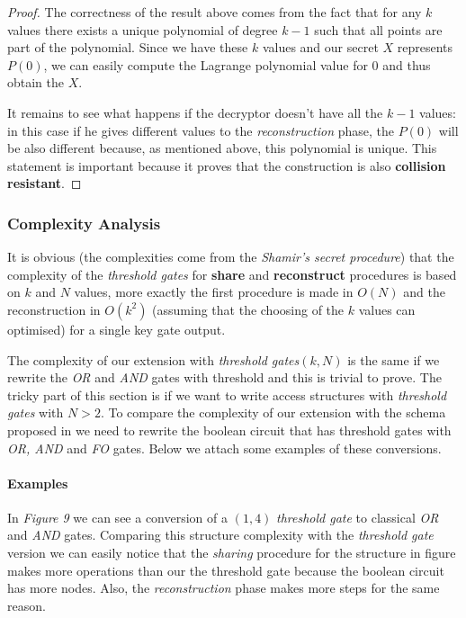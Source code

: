 \documentclass[12pt]{article}
\begin{document}
\begin{proof}
The correctness of the result above comes from the fact that for any $k$ values there exists a unique polynomial of degree $k - 1$ such that all points are part of the polynomial. Since we have these $k$ values and our secret $X$ represents $P(0)$, we can easily compute the Lagrange polynomial value for $0$ and thus obtain the  $X$.

It remains to see what happens if the decryptor doesn't have all the $k - 1$ values: in this case if he gives different values to the \textit{reconstruction} phase, the $P(0)$ will be also different because, as mentioned above, this polynomial is unique. This statement is important because it proves that the construction is also \textbf{collision resistant}.

\end{proof}

\subsubsection{Complexity Analysis}

It is obvious (the complexities come from the \textit{Shamir's secret procedure}) that the complexity of the \textit{threshold gates} for \textbf{share} and \textbf{reconstruct} procedures is based on $k$ and $N$ values, more exactly the first procedure is made in $O(N)$ and the reconstruction in $O(k^ 2)$ (assuming that the choosing of the $k$ values can optimised) for a single key gate output.

The complexity of our extension with \textit{threshold gates}$(k, N)$ is the same if we rewrite the \textit{OR} and \textit{AND} gates with threshold and this is trivial to prove. The tricky part of this section is if we want to write access structures with \textit{threshold gates} with $N > 2$. To compare the complexity of our extension with the schema proposed in \cite{fltccd} we need to rewrite the boolean circuit that has threshold gates with \textit{OR, AND} and \textit{FO} gates. Below we attach some examples of these conversions.

\paragraph{Examples}

In \textit{Figure 9} we can see a conversion of a $(1, 4)$ \textit{threshold gate} to classical \textit{OR} and \textit{AND} gates. Comparing this structure complexity with the \textit{threshold gate} version we can easily notice that the \textit{sharing} procedure for the structure in figure makes more operations than our the threshold gate because the boolean circuit has more nodes. Also, the \textit{reconstruction} phase makes more steps for the same reason.
\end{document}
